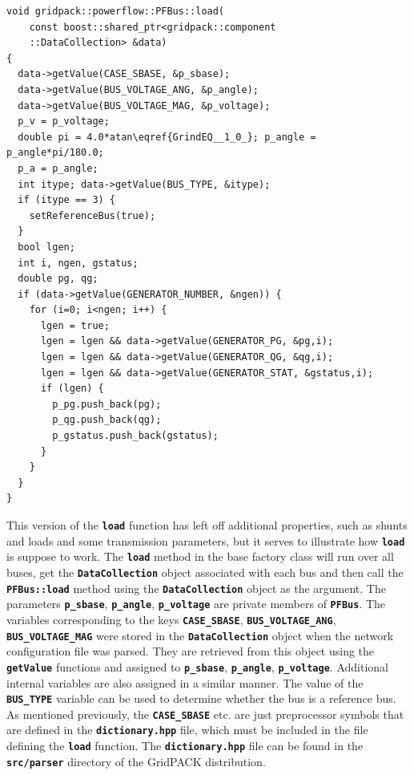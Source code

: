 \documentclass[12pt]{report} %
\begin{document}
{
\color{red}
\begin{Verbatim}[fontseries=b]
void gridpack::powerflow::PFBus::load(
    const boost::shared_ptr<gridpack::component
    ::DataCollection> &data)
{
  data->getValue(CASE_SBASE, &p_sbase);
  data->getValue(BUS_VOLTAGE_ANG, &p_angle);
  data->getValue(BUS_VOLTAGE_MAG, &p_voltage);
  p_v = p_voltage;
  double pi = 4.0*atan\eqref{GrindEQ__1_0_}; p_angle = p_angle*pi/180.0;
  p_a = p_angle;
  int itype; data->getValue(BUS_TYPE, &itype);
  if (itype == 3) {
    setReferenceBus(true);
  }
  bool lgen;
  int i, ngen, gstatus;
  double pg, qg;
  if (data->getValue(GENERATOR_NUMBER, &ngen)) {
    for (i=0; i<ngen; i++) {
      lgen = true;
      lgen = lgen && data->getValue(GENERATOR_PG, &pg,i);
      lgen = lgen && data->getValue(GENERATOR_QG, &qg,i);
      lgen = lgen && data->getValue(GENERATOR_STAT, &gstatus,i);
      if (lgen) {
        p_pg.push_back(pg);
        p_qg.push_back(qg);
        p_gstatus.push_back(gstatus);
      }
    }
  }
}
\end{Verbatim}
}

This version of the \texttt{\textbf{load}} function has left off additional properties, such as shunts and loads and some transmission parameters, but it serves to illustrate how \texttt{\textbf{load}} is suppose to work. The \texttt{\textbf{load}} method in the base factory class will run over all buses, get the \texttt{\textbf{DataCollection}} object associated with each bus and then call the \texttt{\textbf{PFBus::load}} method using the \texttt{\textbf{DataCollection}} object as the argument. The parameters \texttt{\textbf{p\_sbase}}, \texttt{\textbf{p\_angle}}, \texttt{\textbf{p\_voltage}} are private members of \texttt{\textbf{PFBus}}. The variables corresponding to the keys \texttt{\textbf{CASE\_SBASE}}, \texttt{\textbf{BUS\_VOLTAGE\_ANG}}, \texttt{\textbf{BUS\_VOLTAGE\_MAG}} were stored in the \texttt{\textbf{DataCollection}} object when the network configuration file was parsed. They are retrieved from this object using the \texttt{\textbf{getValue}} functions and assigned to \texttt{\textbf{p\_sbase}}, \texttt{\textbf{p\_angle}}, \texttt{\textbf{p\_voltage}}. Additional internal variables are also assigned in a similar manner. The value of the \texttt{\textbf{BUS\_TYPE}} variable can be used to determine whether the bus is a reference bus. As mentioned previously, the \texttt{\textbf{CASE\_SBASE}} etc. are just preprocessor symbols that are defined in the \texttt{\textbf{dictionary.hpp}} file, which must be included in the file defining the \texttt{\textbf{load}} function. The \texttt{\textbf{dictionary.hpp}} file can be found in the \texttt{\textbf{src/parser}} directory of the GridPACK distribution.
\end{document}
